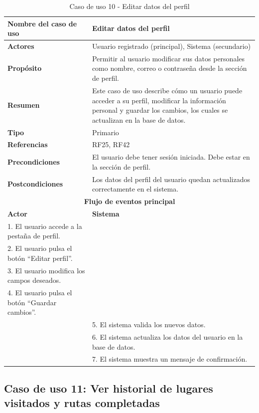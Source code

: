 \begin{table}[H]
\centering
\caption{Caso de uso 10 - Editar datos del perfil}
\begin{tabular}{|p{4.5cm}|p{10.5cm}|}
\hline
\textbf{Nombre del caso de uso} & Editar datos del perfil \\
\hline
\textbf{Actores} & Usuario registrado (principal), Sistema (secundario) \\
\hline
\textbf{Propósito} & Permitir al usuario modificar sus datos personales como nombre, correo o contraseña desde la sección de perfil. \\
\hline
\textbf{Resumen} & Este caso de uso describe cómo un usuario puede acceder a su perfil, modificar la información personal y guardar los cambios, los cuales se actualizan en la base de datos. \\
\hline
\textbf{Tipo} & Primario \\
\hline
\textbf{Referencias} & RF25, RF42 \\
\hline
\textbf{Precondiciones} & El usuario debe tener sesión iniciada. Debe estar en la sección de perfil. \\
\hline
\textbf{Postcondiciones} & Los datos del perfil del usuario quedan actualizados correctamente en el sistema. \\
\hline
\multicolumn{2}{|c|}{\textbf{Flujo de eventos principal}} \\
\hline
\textbf{Actor} & \textbf{Sistema} \\
\hline
1. El usuario accede a la pestaña de perfil. & \\
\hline
2. El usuario pulsa el botón ``Editar perfil''. & \\
\hline
3. El usuario modifica los campos deseados. & \\
\hline
4. El usuario pulsa el botón ``Guardar cambios''. & \\
\hline
& 5. El sistema valida los nuevos datos. \\
\hline
& 6. El sistema actualiza los datos del usuario en la base de datos. \\
\hline
& 7. El sistema muestra un mensaje de confirmación. \\
\hline
\end{tabular}
\end{table}

\clearpage
\subsection{Caso de uso 11: Ver historial de lugares visitados y rutas completadas}

